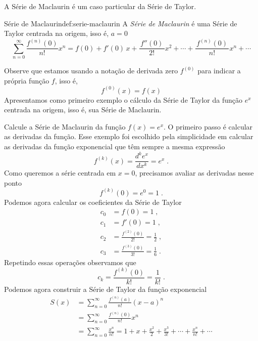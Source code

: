 A Série de Maclaurin é um caso particular da Série de Taylor.

\begin{definicao}{Série de Maclaurin}{def:serie-maclaurin}
  A \emph{Série de Maclaurin}
é uma Série de Taylor centrada na origem, isso é, $a=0$
\[
	\sum_{n=0}^\infty \frac{f^{(n)}(0)}{n!}x^n
    = f(0)
    +	f'(0)\,x
    +	\frac{\,f''(0)\,}{2!}x^2
    + \cdots
    +	\frac{\,f^{(n)}(0)\,}{n!}x^n
    + \cdots
\]
\end{definicao}

Observe que estamos usando a notação de derivada zero $f^{(0)}$
para indicar a própria função $f$, isso é,
\[
  f^{(0)}(x) = f(x)
\]
Apresentamos como primeiro exemplo o cálculo da Série de Taylor da
função $e^x$ centrada na origem, isso é, sua Série de Maclaurin.

\begin{example}
	Calcule a Série de Maclaurin da função $f(x)=e^x$.
	\solution
	O primeiro passo é calcular as derivadas da função.
	Esse exemplo foi escolhido pela simplicidade em calcular as derivadas
  da função exponencial que têm sempre a mesma expressão
	\[
		f^{(k)}(x) = \frac{d^ke^x}{dx^k} = e^x     \;.
	\]
	Como queremos a série centrada em $x=0$, precisamos avaliar as derivadas nesse ponto
	\[
		f^{(k)}(0) = e^0 = 1     \;.
	\]
	Podemos agora calcular os coeficientes da Série de Taylor
	\begin{align*}
	  c_0 & = f(0) = 1                            \;,\\[3mm]
	  c_1 & = f'(0) = 1                           \;,\\[3mm]
	  c_2 & = \frac{f^{(2)}(0)}{2!} = \frac{1}{2} \;,\\[3mm]
	  c_3 & = \frac{f^{(3)}(0)}{3!} = \frac{1}{6} \;.
	\end{align*}
	Repetindo essas operações observamos que
	\[
		c_k = \frac{f^{(k)}(0)}{k!} = \frac{1}{k!} \;.
	\]
	Podemos agora construir a Série de Taylor da função exponencial
	\begin{align*}
		S(x) & = \sum_{n=0}^\infty \frac{f^{(n)}(a)}{n!}(x-a)^n \\[3mm]
         & = \sum_{n=0}^\infty \frac{f^{(n)}(0)}{n!}x^n     \\[3mm]
         & = \sum_{n=0}^\infty \frac{x^n}{n!}
           = 1 + x + \frac{x^2}{2} + \frac{x^3}{3!} + \cdots + \frac{x^n}{n!}+\cdots
	\end{align*}
\end{example}

